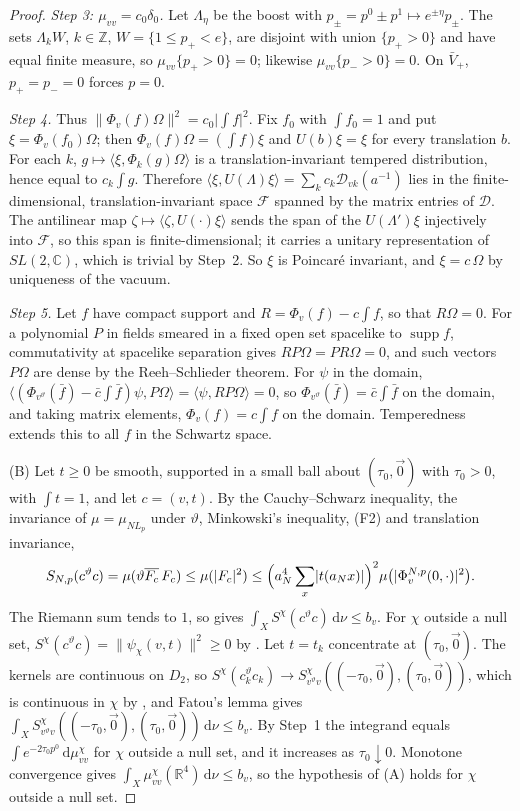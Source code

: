 \documentclass[11pt,a4paper]{amsart}
\theoremstyle{definition}
\theoremstyle{remark}
\numberwithin{equation}{section}
\newcommand{\R}{\mathbb{R}}          %
\newcommand{\C}{\mathbb{C}}          %
\newcommand{\Z}{\mathbb{Z}}          %
\newcommand{\ip}[2]{\langle #1,#2\rangle}  %
\newcommand{\norm}[1]{\lVert #1\rVert}     %
\newcommand{\abs}[1]{\lvert #1\rvert}      %
\newcommand{\dd}{\,\mathrm{d}}             %
\newcommand{\hypW}{\text{\upshape(W)}}              %
\newcommand{\aN}{a_N}                      %
\newcommand{\Lp}{L_p}                      %
\begin{document}
\begin{proof}
\emph{Step 3: $\mu_{vv}=c_0\delta_0$.} Let $\Lambda_\eta$ be the boost with $p_\pm=p^0\pm p^1\mapsto e^{\pm\eta}p_\pm$. The sets $\Lambda_k W$, $k\in\Z$, $W=\{1\le p_+<e\}$, are disjoint with union $\{p_+>0\}$ and have equal finite measure, so $\mu_{vv}\{p_+>0\}=0$; likewise $\mu_{vv}\{p_->0\}=0$. On $\bar V_+$, $p_+=p_-=0$ forces $p=0$.

\emph{Step 4.} Thus $\norm{\Phi_v(f)\Omega}^2=c_0\abs{\int f}^2$. Fix $f_0$ with $\int f_0=1$ and put $\xi=\Phi_v(f_0)\Omega$; then $\Phi_v(f)\Omega=(\int f)\xi$ and $U(b)\xi=\xi$ for every translation $b$. For each $k$, $g\mapsto\ip{\xi}{\Phi_k(g)\Omega}$ is a translation-invariant tempered distribution, hence equal to $c_k\int g$. Therefore $\ip{\xi}{U(\Lambda)\xi}=\sum_kc_k\mathcal D_{vk}(a^{-1})$ lies in the finite-dimensional, translation-invariant space $\mathcal F$ spanned by the matrix entries of $\mathcal D$. The antilinear map $\zeta\mapsto\ip{\zeta}{U(\cdot)\xi}$ sends the span of the $U(\Lambda')\xi$ injectively into $\mathcal F$, so this span is finite-dimensional; it carries a unitary representation of $SL(2,\C)$, which is trivial by Step~2. So $\xi$ is Poincar\'e invariant, and $\xi=c\,\Omega$ by uniqueness of the vacuum.

\emph{Step 5.} Let $f$ have compact support and $R=\Phi_v(f)-c\int f$, so that $R\Omega=0$. For a polynomial $P$ in fields smeared in a fixed open set spacelike to $\operatorname{supp}f$, commutativity at spacelike separation gives $RP\Omega=PR\Omega=0$, and such vectors $P\Omega$ are dense by the Reeh--Schlieder theorem. For $\psi$ in the domain, $\ip{(\Phi_{v^\vartheta}(\bar f)-\bar c\int\bar f)\psi}{P\Omega}=\ip{\psi}{RP\Omega}=0$, so $\Phi_{v^\vartheta}(\bar f)=\bar c\int\bar f$ on the domain, and taking matrix elements, $\Phi_v(f)=c\int f$ on the domain. Temperedness extends this to all $f$ in the Schwartz space.

(B) Let $t\ge0$ be smooth, supported in a small ball about $(\tau_0,\vec0)$ with $\tau_0>0$, with $\int t=1$, and let $c=(v,t)$. By the Cauchy--Schwarz inequality, the invariance of $\mu=\mu_{N\Lp}$ under $\vartheta$, Minkowski's inequality, (F2) and translation invariance,
\[
S_{N,p}(c^\vartheta c)=\mu(\vartheta\overline{F_c}\,F_c)\le\mu(\abs{F_c}^2)\le\Bigl(\aN^4\sum_x\abs{t(\aN x)}\Bigr)^2\mu\bigl(\abs{\Phi^{N,p}_v(0,\cdot)}^2\bigr).
\]
The Riemann sum tends to $1$, so \hypW{} gives $\int_XS^\chi(c^\vartheta c)\dd\nu\le b_v$. For $\chi$ outside a null set, $S^\chi(c^\vartheta c)=\norm{\psi_\chi(v,t)}^2\ge0$ by \cite[Lemma~13(ii)]{bhattacharjee2026first}. Let $t=t_k$ concentrate at $(\tau_0,\vec0)$. The kernels are continuous on $D_2$, so $S^\chi(c_k^\vartheta c_k)\to S^\chi_{v^\vartheta v}((-\tau_0,\vec0),(\tau_0,\vec0))$, which is continuous in $\chi$ by \hypW, and Fatou's lemma gives $\int_XS^\chi_{v^\vartheta v}((-\tau_0,\vec0),(\tau_0,\vec0))\dd\nu\le b_v$. By Step~1 the integrand equals $\int e^{-2\tau_0p^0}\dd\mu^\chi_{vv}$ for $\chi$ outside a null set, and it increases as $\tau_0\downarrow0$. Monotone convergence gives $\int_X\mu^\chi_{vv}(\R^4)\dd\nu\le b_v$, so the hypothesis of (A) holds for $\chi$ outside a null set.
\end{proof}
\end{document}
